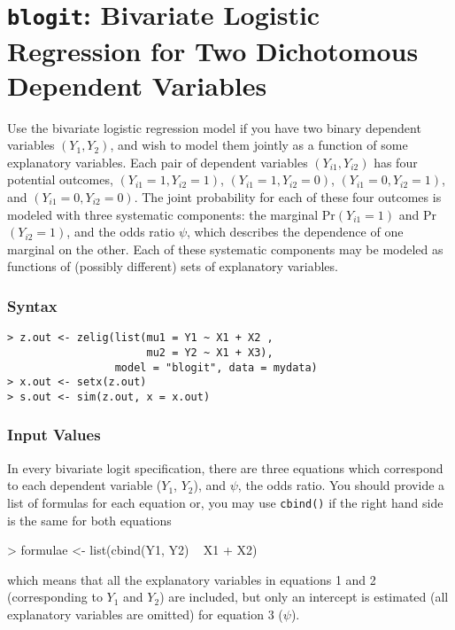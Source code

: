 





\section{{\tt blogit}: Bivariate Logistic Regression for Two
Dichotomous Dependent Variables}\label{blogit}

Use the bivariate logistic regression model if you have two binary
dependent variables $(Y_1, Y_2)$, and wish to model them jointly as a
function of some explanatory variables.  Each pair of dependent
variables $(Y_{i1}, Y_{i2})$ has four potential outcomes, $(Y_{i1}=1,
Y_{i2}=1)$, $(Y_{i1}=1, Y_{i2}=0)$, $(Y_{i1}=0, Y_{i2}=1)$, and
$(Y_{i1}=0, Y_{i2}=0)$.  The joint probability for each of these four
outcomes is modeled with three systematic components: the marginal
Pr$(Y_{i1} = 1)$ and Pr$(Y_{i2} = 1)$, and the odds ratio $\psi$,
which describes the dependence of one marginal on the other.  Each of
these systematic components may be modeled as functions of (possibly
different) sets of explanatory variables.

\subsubsection{Syntax}

\begin{verbatim}
> z.out <- zelig(list(mu1 = Y1 ~ X1 + X2 , 
                      mu2 = Y2 ~ X1 + X3), 
                 model = "blogit", data = mydata)
> x.out <- setx(z.out)
> s.out <- sim(z.out, x = x.out)
\end{verbatim}

\subsubsection{Input Values}

In every bivariate logit specification, there are three equations which
correspond to each dependent variable ($Y_1$, $Y_2$), and $\psi$, the
odds ratio. You should provide a list of formulas for each equation or, 
you may use {\tt cbind()} if the right hand side is the same for both equations
\begin{Schunk}
\begin{Sinput}
> formulae <- list(cbind(Y1, Y2) ~ X1 + X2)
\end{Sinput}
\end{Schunk}
which means that all the explanatory variables in equations 1 and 2
(corresponding to $Y_1$ and $Y_2$) are included, but only an intercept
is estimated (all explanatory variables are omitted) for equation 3
($\psi$).  

